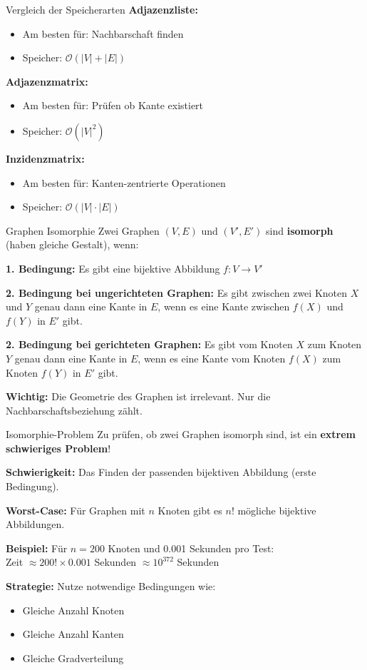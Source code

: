 \documentclass[a4paper, fontsize=7pt]{scrartcl}
\begin{document}
\begin{subbox}{Vergleich der Speicherarten}
\textbf{Adjazenzliste:}
\begin{itemize}
    \item Am besten f\"ur: Nachbarschaft finden
    \item Speicher: $\mathcal{O}(|V| + |E|)$
\end{itemize}

\textbf{Adjazenzmatrix:}
\begin{itemize}
    \item Am besten f\"ur: Pr\"ufen ob Kante existiert
    \item Speicher: $\mathcal{O}(|V|^2)$
\end{itemize}

\textbf{Inzidenzmatrix:}
\begin{itemize}
    \item Am besten f\"ur: Kanten-zentrierte Operationen
    \item Speicher: $\mathcal{O}(|V| \cdot |E|)$
\end{itemize}
\end{subbox}

\begin{mainbox}{Graphen Isomorphie}
Zwei Graphen $(V, E)$ und $(V', E')$ sind \textbf{isomorph} (haben gleiche Gestalt), wenn:

\textbf{1. Bedingung:}
Es gibt eine bijektive Abbildung $f: V \to V'$

\textbf{2. Bedingung bei ungerichteten Graphen:}
Es gibt zwischen zwei Knoten $X$ und $Y$ genau dann eine Kante in $E$, wenn es eine Kante zwischen $f(X)$ und $f(Y)$ in $E'$ gibt.

\textbf{2. Bedingung bei gerichteten Graphen:}
Es gibt vom Knoten $X$ zum Knoten $Y$ genau dann eine Kante in $E$, wenn es eine Kante vom Knoten $f(X)$ zum Knoten $f(Y)$ in $E'$ gibt.

\textbf{Wichtig:}
Die Geometrie des Graphen ist irrelevant. Nur die Nachbarschaftsbeziehung z\"ahlt.
\end{mainbox}

\begin{subbox}{Isomorphie-Problem}
Zu pr\"ufen, ob zwei Graphen isomorph sind, ist ein \textbf{extrem schwieriges Problem}!

\textbf{Schwierigkeit:}
Das Finden der passenden bijektiven Abbildung (erste Bedingung).

\textbf{Worst-Case:}
F\"ur Graphen mit $n$ Knoten gibt es $n!$ m\"ogliche bijektive Abbildungen.

\textbf{Beispiel:}
F\"ur $n = 200$ Knoten und 0.001 Sekunden pro Test:\\
Zeit $\approx 200! \times 0.001$ Sekunden $\approx 10^{372}$ Sekunden

\textbf{Strategie:}
Nutze notwendige Bedingungen wie:
\begin{itemize}
    \item Gleiche Anzahl Knoten
    \item Gleiche Anzahl Kanten
    \item Gleiche Gradverteilung
\end{itemize}
\end{subbox}
\end{document}

